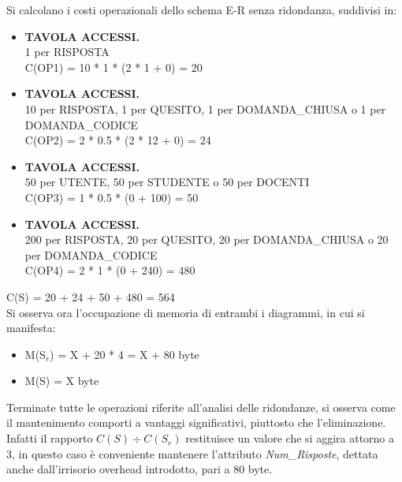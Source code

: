 \documentclass{article}
\begin{document}
\newpage
Si calcolano i costi operazionali dello schema E-R senza ridondanza, suddivisi in:
\begin{itemize}[label={ }]
    \itemsep0em 
    \item {\small\textbf{TAVOLA ACCESSI.} \\ 1 per RISPOSTA} \vspace*{2pt}\\ C(OP1) = 10 * 1 * (2 * 1 + 0) = 20 \vspace*{2pt} 
    \item {\small\textbf{TAVOLA ACCESSI.} \\ 10 per RISPOSTA, 1 per QUESITO, 1 per DOMANDA\_CHIUSA o 1 per DOMANDA\_CODICE} \vspace*{2pt}\\ C(OP2) = 2 * 0.5 * (2 * 12 + 0) = 24 \vspace*{2pt}
    \item {\small\textbf{TAVOLA ACCESSI.} \\ 50 per UTENTE, 50 per STUDENTE o 50 per DOCENTI} \vspace*{2pt}\\ C(OP3) = 1 * 0.5 * (0 + 100) = 50
    \item {\small\textbf{TAVOLA ACCESSI.} \\ 200 per RISPOSTA, 20 per QUESITO, 20 per DOMANDA\_CHIUSA o 20 per DOMANDA\_CODICE} \vspace*{2pt}\\ C(OP4) = 2 * 1 * (0 + 240) = 480
\end{itemize}
\hspace*{15pt}C(S) = 20 + 24 + 50 + 480 = 564 \vspace*{7pt} \vspace*{7pt}\\
Si osserva ora l'occupazione di memoria di entrambi i diagrammi, in cui si manifesta:
\begin{itemize}[label={-}]
    \itemsep0em
    \item M(S$_r$) = X + 20 * 4 = X + 80 byte
    \item M(S) = \hspace*{1pt}X byte
\end{itemize}
Terminate tutte le operazioni riferite all'analisi delle ridondanze, si osserva come il mantenimento comporti a vantaggi significativi, piuttosto che l'eliminazione. Infatti il rapporto $C(S) \div C(S_r)$ restituisce un valore che si aggira attorno a 3, in questo caso è conveniente mantenere l'attributo \textit{Num\_Risposte}, dettata anche dall'irrisorio overhead introdotto, pari a 80 byte.
\end{document}
